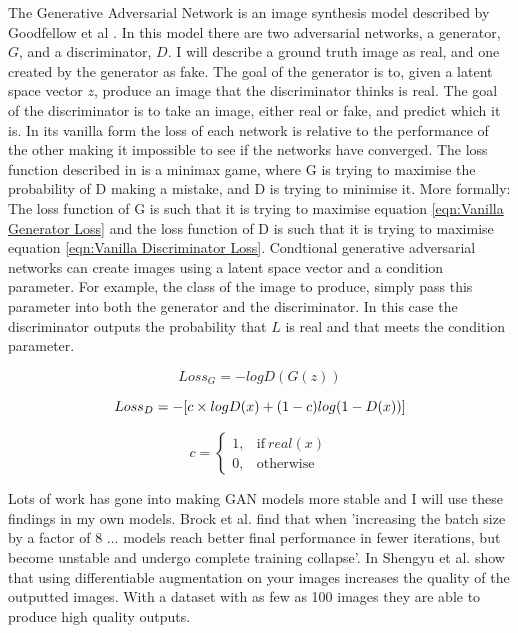 \documentclass{UoYCSproject}
\begin{document}

The Generative Adversarial Network is an image synthesis model described by Goodfellow et al \cite{goodfellow2014generative}. In this model there are two adversarial networks, a generator, $ G $, and a discriminator, $ D $. I will describe a ground truth image as real, and one created by the generator as fake. The goal of the generator is to, given a latent space vector $ z $, produce an image that the discriminator thinks is real. The goal of the discriminator is to take an image, either real or fake, and predict which it is. In its vanilla form the loss of each network is relative to the performance of the other making it impossible to see if the networks have converged. The loss function described in \cite{goodfellow2014generative} is a minimax game, where G is trying to maximise the probability of D making a mistake, and D is trying to minimise it. More formally: The loss function of G is such that it is trying to maximise equation \ref{eqn:Vanilla Generator Loss} and the loss function of D is such that it is trying to maximise equation \ref{eqn:Vanilla Discriminator Loss}. Condtional generative adversarial networks can create images using a latent space vector and a condition parameter. For example, the class of the image to produce, simply pass this parameter into both the generator and the discriminator. In this case the discriminator outputs the probability that $ L $ is real and that meets the condition parameter.

\begin{equation}
    \label{eqn:Vanilla Generator Loss}
    Loss_G = -logD (G(z)) 
\end{equation}

\begin{equation}
    \label{eqn:Vanilla Discriminator Loss}
    Loss_D = -[c \times logD(x) + (1-c) log (1 - D(x))] \\
\end{equation}

\[ c =
\begin{cases}
  1, & \text{if}\ real(x) \\
  0, & \text{otherwise}
\end{cases} \]

Lots of work has gone into making GAN models more stable and I will use these findings in my own models. Brock et al. find that when 'increasing the batch size by a factor of 8 ... models reach better final performance in fewer iterations, but become unstable and undergo complete training collapse'\cite[3]{brock2019large}.
In \cite{zhao2020differentiable} Shengyu et al. show that using differentiable augmentation on your images increases the quality of the outputted images. With a dataset with as few as 100 images they are able to produce high quality outputs.
\end{document}
